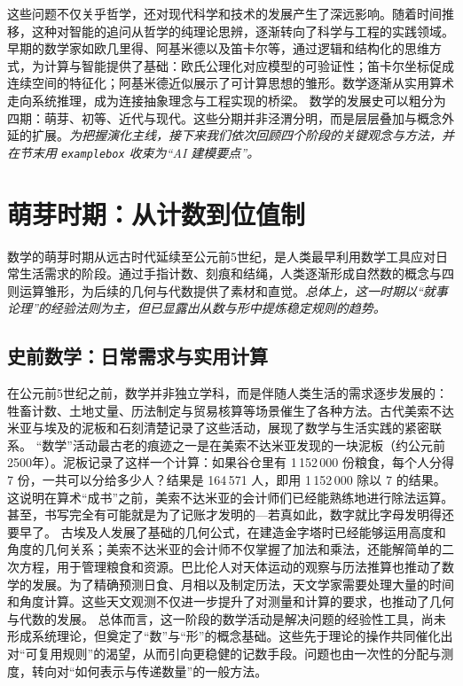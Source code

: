 这些问题不仅关乎哲学，还对现代科学和技术的发展产生了深远影响。随着时间推移，这种对智能的追问从哲学的纯理论思辨，逐渐转向了科学与工程的实践领域。早期的数学家如欧几里得、阿基米德以及笛卡尔等，通过逻辑和结构化的思维方式，为计算与智能提供了基础：欧氏公理化对应模型的可验证性；笛卡尔坐标促成连续空间的特征化；阿基米德近似展示了可计算思想的雏形。数学逐渐从实用算术走向系统推理，成为连接抽象理念与工程实现的桥梁。
数学的发展史可以粗分为四期：萌芽、初等、近代与现代。这些分期并非泾渭分明，而是层层叠加与概念外延的扩展。\emph{为把握演化主线，接下来我们依次回顾四个阶段的关键观念与方法，并在节末用 \texttt{examplebox} 收束为“AI 建模要点”。}
\section{萌芽时期：从计数到位值制}


数学的萌芽时期从远古时代延续至公元前5世纪，是人类最早利用数学工具应对日常生活需求的阶段。通过手指计数、刻痕和结绳，人类逐渐形成自然数的概念与四则运算雏形，为后续的几何与代数提供了素材和直觉。\emph{总体上，这一时期以“就事论理”的经验法则为主，但已显露出从数与形中提炼稳定规则的趋势。}
\subsection{史前数学：日常需求与实用计算}



在公元前5世纪之前，数学并非独立学科，而是伴随人类生活的需求逐步发展的：牲畜计数、土地丈量、历法制定与贸易核算等场景催生了各种方法。古代美索不达米亚与埃及的泥板和石刻清楚记录了这些活动，展现了数学与生活实践的紧密联系。
“数学”活动最古老的痕迹之一是在美索不达米亚发现的一块泥板（约公元前2500年）。泥板记录了这样一个计算：如果谷仓里有 1\,152\,000 份粮食，每个人分得 7 份，一共可以分给多少人？结果是 164\,571 人，即用 1\,152\,000 除以 7 的结果。这说明在算术“成书”之前，美索不达米亚的会计师们已经能熟练地进行除法运算。甚至，书写完全有可能就是为了记账才发明的---若真如此，数字就比字母发明得还要早了。
古埃及人发展了基础的几何公式，在建造金字塔时已经能够运用高度和角度的几何关系；美索不达米亚的会计师不仅掌握了加法和乘法，还能解简单的二次方程，用于管理粮食和资源。巴比伦人对天体运动的观察与历法推算也推动了数学的发展。为了精确预测日食、月相以及制定历法，天文学家需要处理大量的时间和角度计算。这些天文观测不仅进一步提升了对测量和计算的要求，也推动了几何与代数的发展。
总体而言，这一阶段的数学活动是解决问题的经验性工具，尚未形成系统理论，但奠定了“数”与“形”的概念基础。这些先于理论的操作共同催化出对“可复用规则”的渴望，从而引向更稳健的记数手段。问题也由一次性的分配与测度，转向对“如何表示与传递数量”的一般方法。

